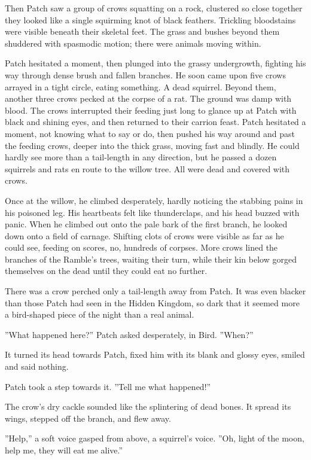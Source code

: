 \documentclass[12pt]{book}
\begin{document}
Then Patch saw a group of crows squatting on a rock, clustered so
close together they looked like a single squirming knot of black
feathers. Trickling bloodstains were visible beneath their skeletal
feet. The grass and bushes beyond them shuddered with spasmodic
motion; there were animals moving within.

Patch hesitated a moment, then plunged into the grassy undergrowth,
fighting his way through dense brush and fallen branches. He soon came
upon five crows arrayed in a tight circle, eating something. A dead
squirrel. Beyond them, another three crows pecked at the corpse of a
rat. The ground was damp with blood. The crows interrupted their
feeding just long to glance up at Patch with black and shining eyes,
and then returned to their carrion feast. Patch hesitated a moment,
not knowing what to say or do, then pushed his way around and past the
feeding crows, deeper into the thick grass, moving fast and
blindly. He could hardly see more than a tail-length in any direction,
but he passed a dozen squirrels and rats en route to the willow
tree. All were dead and covered with crows.

Once at the willow, he climbed desperately, hardly noticing the
stabbing pains in his poisoned leg. His heartbeats felt like
thunderclaps, and his head buzzed with panic. When he climbed out onto
the pale bark of the first branch, he looked down onto a field of
carnage. Shifting clots of crows were visible as far as he could see,
feeding on scores, no, hundreds of corpses. More crows lined the
branches of the Ramble's trees, waiting their turn, while their kin
below gorged themselves on the dead until they could eat no further.

There was a crow perched only a tail-length away from Patch. It was
even blacker than those Patch had seen in the Hidden Kingdom, so dark
that it seemed more a bird-shaped piece of the night than a real
animal.

''What happened here?'' Patch asked desperately, in Bird. ''When?''

It turned its head towards Patch, fixed him with its blank and glossy
eyes, smiled and said nothing.

Patch took a step towards it. ''Tell me what happened!''

The crow's dry cackle sounded like the splintering of dead bones. It
spread its wings, stepped off the branch, and flew away.

''Help,'' a soft voice gasped from above, a squirrel's voice. ''Oh,
light of the moon, help me, they will eat me alive.''
\end{document}
